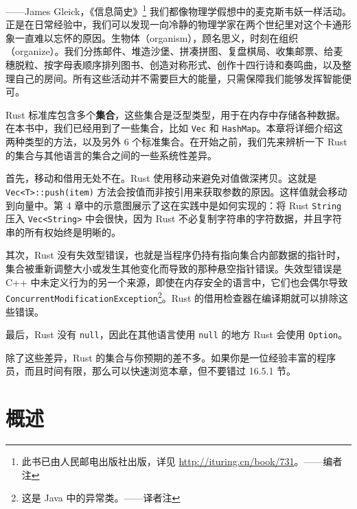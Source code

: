 
\begin{myEpigraph}{——James Gleick，《信息简史》\footnote{此书已由人民邮电出版社出版，详见 \href{http://ituring.cn/book/731}{http://ituring.cn/\allowbreak{}book/\allowbreak{}731}。——编者注}}
我们都像物理学假想中的麦克斯韦妖一样活动。正是在日常经验中，我们可以发现一向冷静的物理学家在两个世纪里对这个卡通形象一直难以忘怀的原因。生物体（organism），顾名思义，时刻在组织（organize）。我们分拣邮件、堆造沙堡、拼凑拼图、复盘棋局、收集邮票、给麦穗脱粒、按字母表顺序排列图书、创造对称形式、创作十四行诗和奏鸣曲，以及整理自己的房间。所有这些活动并不需要巨大的能量，只需保障我们能够发挥智能便可。
\end{myEpigraph}

Rust 标准库包含多个\textbf{集合}，这些集合是泛型类型，用于在内存中存储各种数据。在本书中，我们已经用到了一些集合，比如 \texttt{Vec} 和 \texttt{HashMap}。本章将详细介绍这两种类型的方法，以及另外 6 个标准集合。在开始之前，我们先来辨析一下 Rust 的集合与其他语言的集合之间的一些系统性差异。

首先，移动和借用无处不在。Rust 使用移动来避免对值做深拷贝。这就是 \texttt{Vec<T>::push(item)} 方法会按值而非按引用来获取参数的原因。这样值就会移动到向量中。第 4 章中的示意图展示了这在实践中是如何实现的：将 Rust \texttt{String} 压入 \texttt{Vec<String>} 中会很快，因为 Rust 不必复制字符串的字符数据，并且字符串的所有权始终是明晰的。

其次，Rust 没有失效型错误，也就是当程序仍持有指向集合内部数据的指针时，集合被重新调整大小或发生其他变化而导致的那种悬空指针错误。失效型错误是 C++ 中未定义行为的另一个来源，即使在内存安全的语言中，它们也会偶尔导致 \texttt{ConcurrentModificationException}\footnote{这是 Java 中的异常类。——译者注}。Rust 的借用检查器在编译期就可以排除这些错误。

最后，Rust 没有 \texttt{null}，因此在其他语言使用 \texttt{null} 的地方 Rust 会使用 \texttt{Option}。

除了这些差异，Rust 的集合与你预期的差不多。如果你是一位经验丰富的程序员，而且时间有限，那么可以快速浏览本章，但不要错过 16.5.1 节。

\section{概述}

